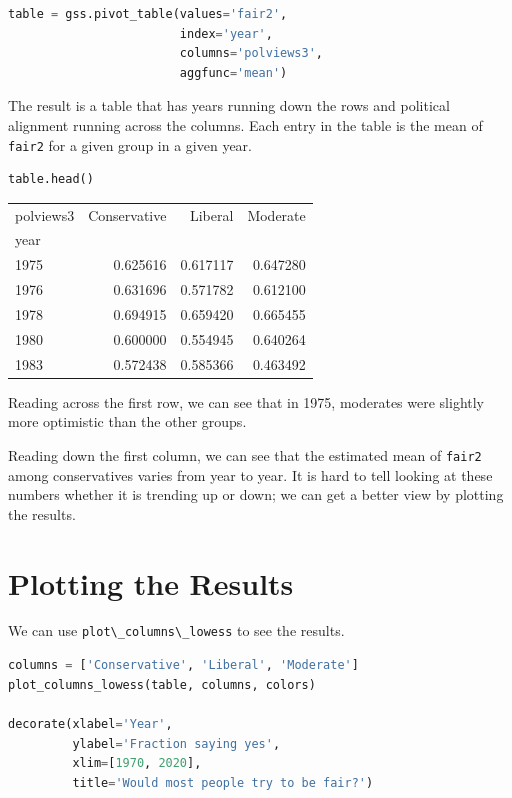 \begin{lstlisting}[language=Python,style=source]
table = gss.pivot_table(values='fair2', 
                        index='year', 
                        columns='polviews3', 
                        aggfunc='mean')
\end{lstlisting}

The result is a table that has years running down the rows and political
alignment running across the columns. Each entry in the table is the
mean of \passthrough{\lstinline!fair2!} for a given group in a given
year.

\begin{lstlisting}[language=Python,style=source]
table.head()
\end{lstlisting}

\begin{tabular}{lrrr}
\toprule
polviews3 &  Conservative &   Liberal &  Moderate \\
year &               &           &           \\
\midrule
1975 &      0.625616 &  0.617117 &  0.647280 \\
1976 &      0.631696 &  0.571782 &  0.612100 \\
1978 &      0.694915 &  0.659420 &  0.665455 \\
1980 &      0.600000 &  0.554945 &  0.640264 \\
1983 &      0.572438 &  0.585366 &  0.463492 \\
\bottomrule
\end{tabular}

Reading across the first row, we can see that in 1975, moderates were
slightly more optimistic than the other groups.

Reading down the first column, we can see that the estimated mean of
\passthrough{\lstinline!fair2!} among conservatives varies from year to
year. It is hard to tell looking at these numbers whether it is trending
up or down; we can get a better view by plotting the results.

\hypertarget{plotting-the-results}{%
\section{Plotting the Results}\label{plotting-the-results}}

We can use \passthrough{\lstinline!plot\_columns\_lowess!} to see the
results.

\begin{lstlisting}[language=Python,style=source]
columns = ['Conservative', 'Liberal', 'Moderate']
plot_columns_lowess(table, columns, colors)

decorate(xlabel='Year',
         ylabel='Fraction saying yes',
         xlim=[1970, 2020],
         title='Would most people try to be fair?')
\end{lstlisting}

